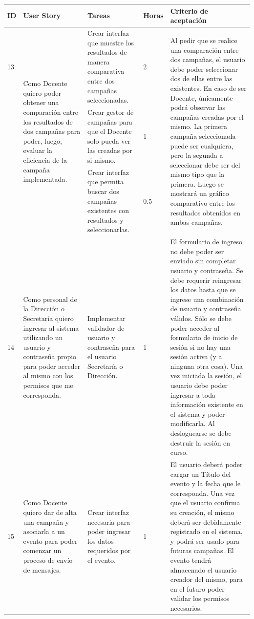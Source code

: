 \documentclass[a4paper, 11pt]{article}
\begin{document}
\begin{table}[H]
\centering
\begin{tabular}{ | p{0.5cm} | p{4cm} | p{5cm} | p{0.85cm} | p{5cm} |}
\hline 
ID & User Story & Tareas & Horas & Criterio de aceptación \\ \hline \hline

13 & \multirow{3}{4cm}{Como Docente quiero poder obtener una comparación entre los resultados de dos campañas para poder, luego, evaluar la eficiencia de la campaña implementada.} &  Crear interfaz que muestre los resultados de manera comparativa entre dos campañas seleccionadas. & 2 & \multirow{3}{5cm}{Al pedir que se realice una comparación entre dos campañas, el usuario debe poder seleccionar dos de ellas entre las existentes. En caso de ser Docente, únicamente podrá observar las campañas creadas por el mismo. La primera campaña seleccionada puede ser cualquiera, pero la segunda a seleccionar debe ser del mismo tipo que la primera. Luego se mostrará un gráfico comparativo entre los resultados obtenidos en ambas campañas. } \\[2.4cm] \cline{3-4}
& & Crear gestor de campañas para que el Docente solo pueda ver las creadas por si mismo. & 1 & \\[2.4cm] \cline{3-4}
& & Crear interfaz que permita buscar dos campañas existentes con resultados y seleccionarlas. & 0.5 & \\[2.4cm] \hline


14 & Como personal de la Dirección o Secretaría quiero ingresar al sistema utilizando un usuario y contraseña propio para poder acceder al mismo con los permisos que me corresponda. & Implementar validador de usuario y contraseña para el usuario Secretaría o Dirección. & 1 & El formulario de ingreso no debe poder ser enviado sin completar usuario y contraseña. Se debe requerir reingresar los datos hasta que se ingrese una combinación de usuario y contraseña válidos. Sólo se debe poder acceder al formulario de inicio de sesión si no hay una sesión activa (y a ninguna otra cosa). Una vez iniciada la sesión, el usuario debe poder ingresar a toda información existente en el sistema y poder modificarla. Al desloguearse se debe destruir la sesión en curso. \\ \hline



15 & Como Docente quiero dar de alta una campaña y asociarla a un evento para poder comenzar un proceso de envío de mensajes. & Crear interfaz necesaria para poder ingresar los datos requeridos por el evento. & 1 & El usuario deberá poder cargar un Título del evento y la fecha que le corresponda. Una vez que el usuario confirma su creación, el mismo deberá ser debidamente registrado en el sistema, y podrá ser usado para futuras campañas. El evento tendrá almacenado el usuario creador del mismo, para en el futuro poder validar los permisos necesarios.  \\ \hline
\end{tabular}
\end{table}
\end{document}
